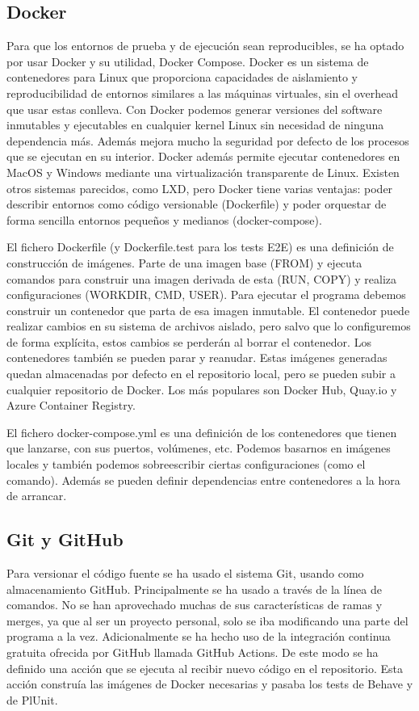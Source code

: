 \documentclass[12pt]{report} %
\begin{document}
\subsection{Docker}
Para que los entornos de prueba y de ejecución sean reproducibles, se ha optado por usar Docker y su utilidad, Docker Compose.
Docker es un sistema de contenedores para Linux que proporciona capacidades de aislamiento y reproducibilidad de entornos similares a las máquinas virtuales, sin el overhead que usar estas conlleva. Con Docker podemos generar versiones del software inmutables y ejecutables en cualquier kernel Linux sin necesidad de ninguna dependencia más.
Además mejora mucho la seguridad por defecto de los procesos que se ejecutan en su interior.
Docker además permite ejecutar contenedores en MacOS y Windows mediante una virtualización transparente de Linux.
Existen otros sistemas parecidos, como LXD, pero Docker tiene varias ventajas: poder describir entornos como código versionable (Dockerfile) y poder orquestar de forma sencilla entornos pequeños y medianos (docker-compose).

El fichero Dockerfile (y Dockerfile.test para los tests E2E) es una definición de construcción de imágenes. Parte de una imagen base (FROM) y ejecuta comandos para construir una imagen derivada de esta (RUN, COPY) y realiza configuraciones (WORKDIR, CMD, USER). Para ejecutar el programa debemos construir un contenedor que parta de esa imagen inmutable. El contenedor puede realizar cambios en su sistema de archivos aislado, pero salvo que lo configuremos de forma explícita, estos cambios se perderán al borrar el contenedor. Los contenedores también se pueden parar y reanudar. Estas imágenes generadas quedan almacenadas por defecto en el repositorio local, pero se pueden subir a cualquier repositorio de Docker. Los más populares son Docker Hub, Quay.io y Azure Container Registry.

El fichero docker-compose.yml es una definición de los contenedores que tienen que lanzarse, con sus puertos, volúmenes, etc. Podemos basarnos en imágenes locales y también podemos sobreescribir ciertas configuraciones (como el comando). Además se pueden definir dependencias entre contenedores a la hora de arrancar.

\subsection{Git y GitHub}
Para versionar el código fuente se ha usado el sistema Git, usando como almacenamiento GitHub. Principalmente se ha usado a través de la línea de comandos.
No se han aprovechado muchas de sus características de ramas y merges, ya que al ser un proyecto personal, solo se iba modificando una parte del programa a la vez.
Adicionalmente se ha hecho uso de la integración continua gratuita ofrecida por GitHub llamada GitHub Actions. De este modo se ha definido una acción que se ejecuta al recibir nuevo código en el repositorio.
Esta acción construía las imágenes de Docker necesarias y pasaba los tests de Behave y de PlUnit.
\end{document}
